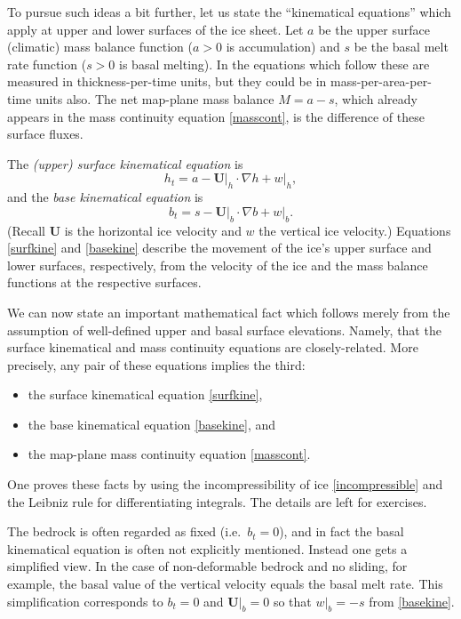 \documentclass[letterpaper,final,12pt,reqno]{amsart}
\newcommand{\grad}{\nabla}
\begin{document}
To pursue such ideas a bit further, let us state the ``kinematical equations'' which apply at upper and lower surfaces of the ice sheet.  Let $a$ be the upper surface (climatic) mass balance function ($a>0$ is accumulation) and $s$ be the basal melt rate function ($s>0$ is basal melting).  In the equations which follow these are measured in thickness-per-time units, but they could be in mass-per-area-per-time units also.  The net map-plane mass balance $M=a-s$, which already appears in the mass continuity equation \eqref{masscont}, is the difference of these surface fluxes.

The \emph{(upper) surface kinematical equation} is 
\begin{equation}
h_t = a - \mathbf{U}\big|_h \cdot \grad h + w\big|_h,  \label{surfkine}
\end{equation}
and the \emph{base kinematical equation} is
\begin{equation}
b_t = s - \mathbf{U}\big|_b \cdot \grad b + w\big|_b.  \label{basekine}
\end{equation}
(Recall $\mathbf{U}$ is the horizontal ice velocity and $w$ the vertical ice velocity.)  Equations \eqref{surfkine} and \eqref{basekine} describe the movement of the ice's upper surface and lower surfaces, respectively, from the velocity of the ice and the mass balance functions at the respective surfaces.

We can now state an important mathematical fact which follows merely from the assumption of well-defined upper and basal surface elevations.  Namely, that the surface kinematical and mass continuity equations are closely-related.  More precisely, any pair of these equations implies the third:
  \begin{itemize}
  \item the surface kinematical equation \eqref{surfkine},
  \item the base kinematical equation \eqref{basekine}, and
  \item the map-plane mass continuity equation \eqref{masscont}.
  \end{itemize}
One proves these facts by using the incompressibility of ice \eqref{incompressible} and the Leibniz rule for differentiating integrals.  The details are left for exercises.

The bedrock is often regarded as fixed (i.e.~$b_t=0$), and in fact the basal kinematical equation is often not explicitly mentioned.  Instead one gets a simplified view.  In the case of non-deformable bedrock and no sliding, for example, the basal value of the vertical velocity equals the basal melt rate.  This simplification corresponds to $b_t=0$ and $\mathbf{U}\big|_b=0$ so that $w\big|_b=-s$ from \eqref{basekine}.
\end{document}
